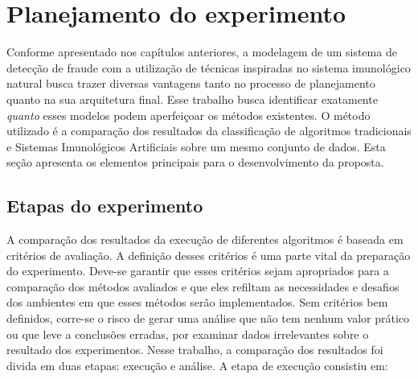 \chapter{Planejamento do experimento}
\label{chap:prop}

Conforme apresentado nos capítulos anteriores, a modelagem de um sistema de detecção de fraude com a utilização de técnicas inspiradas no sistema imunológico natural busca trazer diversas vantagens tanto no processo de planejamento quanto na sua arquitetura final. Esse trabalho busca identificar exatamente \emph{quanto} esses modelos podem aperfeiçoar os métodos existentes. O método utilizado é a comparação dos resultados da classificação de algoritmos tradicionais e Sistemas Imunológicos Artificiais sobre um mesmo conjunto de dados. Esta seção apresenta os elementos principais para o desenvolvimento da proposta.

\section{Etapas do experimento}

A comparação dos resultados da execução de diferentes algoritmos é baseada em critérios de avaliação. A definição desses critérios é uma parte vital da preparação do experimento. Deve-se garantir que esses critérios sejam apropriados para a comparação dos métodos avaliados e que eles refiltam as necessidades e desafios dos ambientes em que esses métodos serão implementados. Sem critérios bem definidos, corre-se o risco de gerar uma análise que não tem nenhum valor prático ou que leve a conclusões erradas, por examinar dados irrelevantes sobre o resultado dos experimentos. Nesse trabalho, a comparação dos resultados foi divida em duas etapas: execução e análise. A etapa de execução consistiu em:

